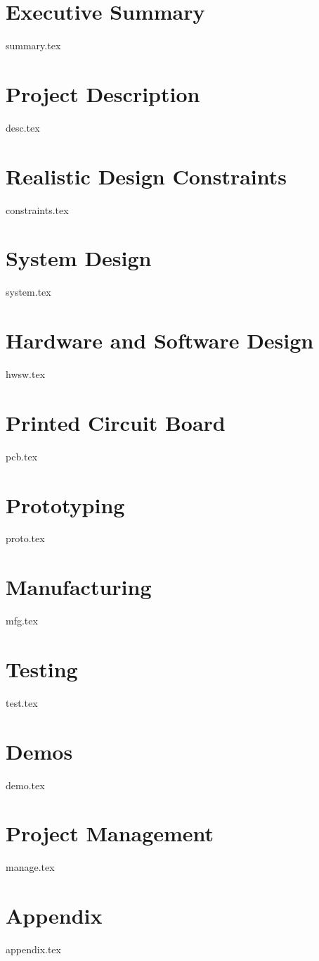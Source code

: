 
\section{Executive Summary}
{summary.tex}

\section{Project Description}
{desc.tex}

\section{Realistic Design Constraints}
{constraints.tex}

\section{System Design}
{system.tex}

\section{Hardware and Software Design}
{hwsw.tex}

\section{Printed Circuit Board}
{pcb.tex}

\section{Prototyping}
{proto.tex}

\section{Manufacturing}
{mfg.tex}

\section{Testing}
{test.tex}

\section{Demos}
{demo.tex}

\section{Project Management}
{manage.tex}

\section{Appendix}
{appendix.tex}

